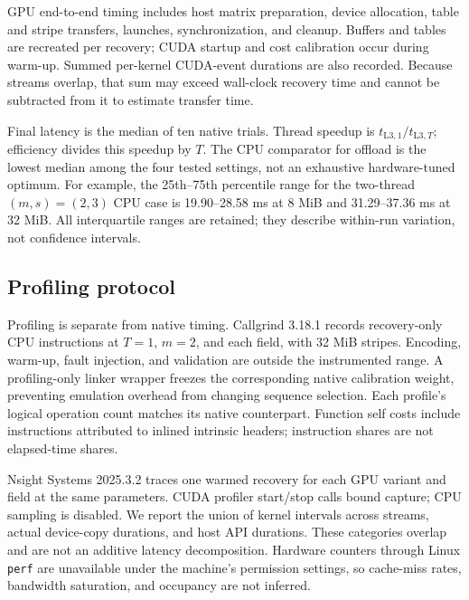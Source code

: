 \documentclass[conference]{IEEEtran}
\begin{document}
GPU end-to-end timing includes host matrix preparation, device allocation, table and stripe transfers, launches, synchronization, and cleanup. Buffers and tables are recreated per recovery; CUDA startup and cost calibration occur during warm-up. Summed per-kernel CUDA-event durations are also recorded. Because streams overlap, that sum may exceed wall-clock recovery time and cannot be subtracted from it to estimate transfer time.

Final latency is the median of ten native trials. Thread speedup is $t_{\mathrm{L3},1}/t_{\mathrm{L3},T}$; efficiency divides this speedup by $T$. The CPU comparator for offload is the lowest median among the four tested settings, not an exhaustive hardware-tuned optimum. For example, the 25th--75th percentile range for the two-thread $(m,s)=(2,3)$ CPU case is 19.90--28.58 ms at 8 MiB and 31.29--37.36 ms at 32 MiB. All interquartile ranges are retained; they describe within-run variation, not confidence intervals.

\subsection{Profiling protocol}
Profiling is separate from native timing. Callgrind 3.18.1 records recovery-only CPU instructions at $T=1$, $m=2$, and each field, with 32 MiB stripes. Encoding, warm-up, fault injection, and validation are outside the instrumented range. A profiling-only linker wrapper freezes the corresponding native calibration weight, preventing emulation overhead from changing sequence selection. Each profile's logical operation count matches its native counterpart. Function self costs include instructions attributed to inlined intrinsic headers; instruction shares are not elapsed-time shares.

Nsight Systems 2025.3.2 traces one warmed recovery for each GPU variant and field at the same parameters. CUDA profiler start/stop calls bound capture; CPU sampling is disabled. We report the union of kernel intervals across streams, actual device-copy durations, and host API durations. These categories overlap and are not an additive latency decomposition. Hardware counters through Linux \texttt{perf} are unavailable under the machine's permission settings, so cache-miss rates, bandwidth saturation, and occupancy are not inferred.
\end{document}
